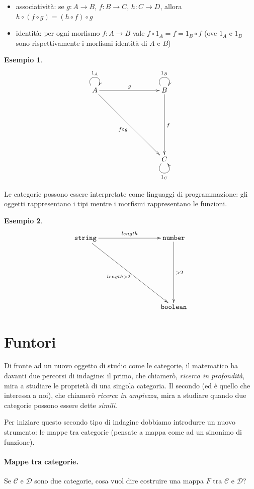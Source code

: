 \documentclass[12pt]{article}
\newtheorem{example}{Esempio}
\begin{document}
\begin{itemize}
  \item associatività: se $g: A \rightarrow B$, $f: B \rightarrow C$, $h: C \rightarrow D$, allora $h \circ (f \circ g) = (h \circ f) \circ g$
  \item identità: per ogni morfismo $f: A \rightarrow B$ vale $f \circ 1_A = f = 1_B \circ f$ (ove $1_A$ e $1_B$ sono rispettivamente i morfismi identità di $A$ e $B$)
\end{itemize}

\begin{example}
\[
\xymatrixrowsep{3cm}
\xymatrixcolsep{3cm}
\xymatrix{
  A \ar@(ul,ur)^{1_A} \ar[r]^g \ar[rd]_{f \circ g} & B \ar@(ul,ur)^{1_B} \ar[d]^f \\
    & C \ar@(dl,dr)_{1_C}
}
\]
\end{example}

Le categorie possono essere interpretate come linguaggi di programmazione: gli oggetti rappresentano i tipi mentre i morfismi
rappresentano le funzioni.

\begin{example}
\[
\xymatrixrowsep{3cm}
\xymatrixcolsep{3cm}
\xymatrix{
  {\texttt{string}} \ar[r]^{length} \ar[rd]_{length > 2} & {\texttt{number}} \ar[d]^{> 2} \\
    & {\texttt{boolean}}
}
\]
\end{example}

\newpage

\section{Funtori}

Di fronte ad un nuovo oggetto di studio come le categorie, il matematico ha davanti due percorsi di indagine: il primo, che chiamerò, \emph{ricerca in profondità},
mira a studiare le proprietà di una singola categoria. Il secondo (ed è quello che interessa a noi), che chiamerò \emph{ricerca in ampiezza},
mira a studiare quando due categorie possono essere dette \emph{simili}.

Per iniziare questo secondo tipo di indagine dobbiamo introdurre un nuovo strumento: le mappe tra categorie
(pensate a mappa come ad un sinonimo di funzione).

\paragraph{Mappe tra categorie.} Se $\mathcal{C}$ e $\mathcal{D}$ sono due categorie, cosa vuol dire costruire una mappa $F$ tra $\mathcal{C}$ e $\mathcal{D}$?
\end{document}
